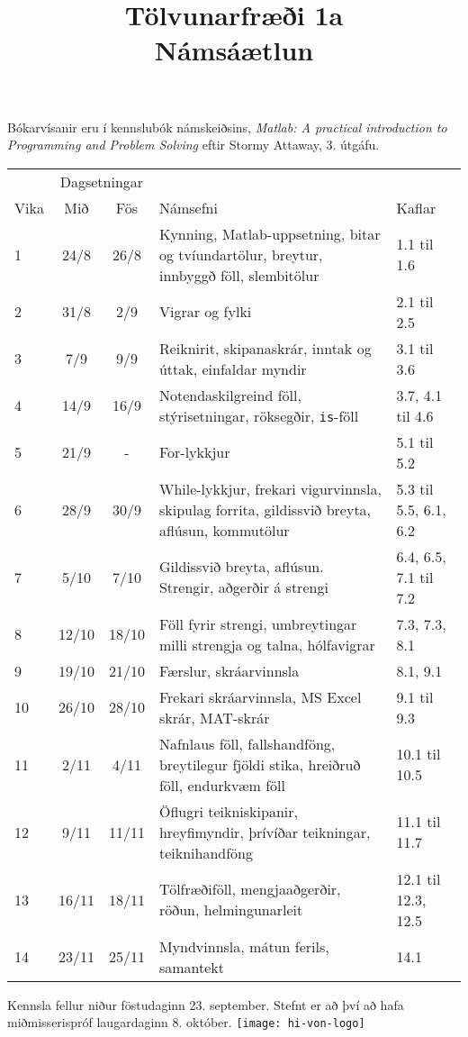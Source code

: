 \documentclass{article}
\title{Tölvunarfræði 1a \\ Námsáætlun \semester}
\author{}
\begin{document}
\maketitle
{}

Bókarvísanir eru í kennslubók námskeiðsins, \emph{Matlab: A practical introduction to Programming and Problem Solving} eftir Stormy Attaway, 3. útgáfu.
\vspace{0.5cm}
\begin{center}
\renewcommand{\arraystretch}{1.2}
\begin{tabularx}{\linewidth}{lccXp{1.8cm}}
\toprule
&\multicolumn{2}{c}{Dagsetningar}&&\\
\cmidrule{2-3}
Vika&Mið&Fös&Námsefni&Kaflar\\
\midrule
1	&24/8	&26/8	& Kynning, Matlab-uppsetning, bitar og tvíundartölur, breytur, innbyggð föll, slembitölur &1.1 til 1.6\\
2	&31/8	&2/9	& Vigrar og fylki&2.1 til 2.5\\
3	&7/9	&9/9	& Reiknirit, skipanaskrár, inntak og úttak, einfaldar myndir&3.1 til 3.6\\
4	&14/9	&16/9	& Notendaskilgreind föll, stýrisetningar, röksegðir, \texttt{is}-föll&3.7, 4.1 til 4.6\\
5	&21/9	&-	& For-lykkjur&5.1 til 5.2\\
6	&28/9	&30/9	& While-lykkjur, frekari vigurvinnsla, skipulag forrita, gildissvið breyta, aflúsun, kommutölur&5.3 til 5.5, 6.1, 6.2\\
7	&5/10	&7/10	& Gildissvið breyta, aflúsun. Strengir, aðgerðir á strengi&6.4, 6.5, 7.1 til 7.2\\
8	&12/10	&18/10	& Föll fyrir strengi, umbreytingar milli strengja og talna, hólfavigrar&7.3, 7.3, 8.1\\
9	&19/10	&21/10	& Færslur, skráarvinnsla&8.1, 9.1\\
10	&26/10	&28/10	& Frekari skráarvinnsla, MS Excel skrár, MAT-skrár&9.1 til 9.3\\
11	&2/11	&4/11	& Nafnlaus föll, fallshandföng, breytilegur fjöldi stika, hreiðruð föll, endurkvæm föll&10.1 til 10.5\\
12	&9/11	&11/11	& Öflugri teikniskipanir, hreyfimyndir, þrívíðar teikningar, teiknihandföng&11.1 til 11.7\\
13	&16/11	&18/11	& Tölfræðiföll, mengjaaðgerðir, röðun, helmingunarleit&12.1 til 12.3, 12.5\\
14	&23/11	&25/11	& Myndvinnsla, mátun ferils, samantekt&14.1\\
\bottomrule
\end{tabularx}
\end{center}
\vspace{0.5cm}
Kennsla fellur niður föstudaginn 23. september. Stefnt er að því að hafa miðmisserispróf laugardaginn 8. október.
\vfill
\texttt{[image: hi-von-logo]}
\end{document}
